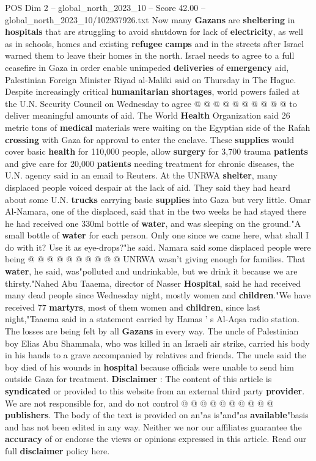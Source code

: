 \begin{textsample}{POS Dim 2 – global\_north\_2023\_10 – Score 42.00 – global\_north\_2023\_10/102937926.txt}
Now many \textbf{Gazans} are \textbf{sheltering} in \textbf{hospitals} that are struggling to avoid shutdown for lack of \textbf{electricity}, as well as in schools, homes and existing \textbf{refugee} \textbf{camps} and in the streets after Israel warned them to leave their homes in the north.
Israel needs to agree to a full ceasefire in Gaza in order enable unimpeded \textbf{deliveries} of \textbf{emergency} aid, Palestinian Foreign Minister Riyad al-Maliki said on Thursday in The Hague.
Despite increasingly critical \textbf{humanitarian} \textbf{shortages}, world powers failed at the U.N.
Security Council on Wednesday to agree @ @ @ @ @ @ @ @ @ @ to deliver meaningful amounts of aid.
The World \textbf{Health} Organization said 26 metric tons of \textbf{medical} materials were waiting on the Egyptian side of the Rafah \textbf{crossing} with Gaza for approval to enter the enclave.
These \textbf{supplies} would cover basic \textbf{health} for 110,000 people, allow \textbf{surgery} for 3,700 trauma \textbf{patients} and give care for 20,000 \textbf{patients} needing treatment for chronic diseases, the U.N. agency said in an email to Reuters.
At the UNRWA \textbf{shelter}, many displaced people voiced despair at the lack of aid.
They said they had heard about some U.N. \textbf{trucks} carrying basic \textbf{supplies} into Gaza but very little.
Omar Al-Namara, one of the displaced, said that in the two weeks he had stayed there he had received one 330ml bottle of \textbf{water}, and was sleeping on the ground."A small bottle of \textbf{water} for each person.
Only one since we came here, what shall I do with it?
Use it as eye-drops?"he said.
Namara said some displaced people were being @ @ @ @ @ @ @ @ @ @ UNRWA wasn't giving enough for families.
That \textbf{water}, he said, was"polluted and undrinkable, but we drink it because we are thirsty."Nahed Abu Taaema, director of Nasser \textbf{Hospital}, said he had received many dead people since Wednesday night, mostly women and \textbf{children}."We have received 77 \textbf{martyrs}, most of them women and \textbf{children}, since last night,"Taaema said in a statement carried by Hamas ' s Al-Aqsa radio station.
The losses are being felt by all \textbf{Gazans} in every way.
The uncle of Palestinian boy Elias Abu Shammala, who was killed in an Israeli air strike, carried his body in his hands to a grave accompanied by relatives and friends.
The uncle said the boy died of his wounds in \textbf{hospital} because officials were unable to send him outside Gaza for treatment. \textbf{Disclaimer} : The content of this article is \textbf{syndicated} or provided to this website from an external third party \textbf{provider}.
We are not responsible for, and do not control @ @ @ @ @ @ @ @ @ @ \textbf{publishers}.
The body of the text is provided on an"as is"and"as \textbf{available}"basis and has not been edited in any way.
Neither we nor our affiliates guarantee the \textbf{accuracy} of or endorse the views or opinions expressed in this article.
Read our full \textbf{disclaimer} policy here.


\end{textsample}
